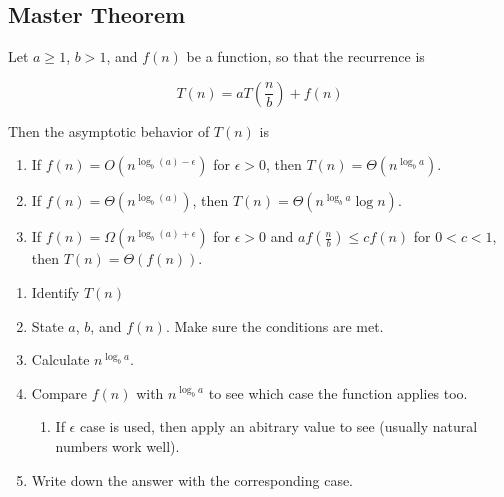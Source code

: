 \documentclass{article}
\begin{document}
\subsection{Master Theorem}
\begin{theorem}
    Let \( a \geq 1 \), \( b > 1 \), and \( f(n) \) be a function, so that the recurrence is 

    \begin{equation}
        T(n) = aT\left(\frac{n}{b}\right) + f(n)
    \end{equation}

    Then the asymptotic behavior of \( T(n) \) is
    \begin{enumerate}
        \item If \( f(n) = O\left(n^{\log_b (a) - \epsilon}\right) \) for \( \epsilon > 0 \), then \( T(n) = \Theta\left(n^{\log_b a}\right) \).
        
        \item If \( f(n) = \Theta\left(n^{\log_b (a)}\right) \), then \( T(n) = \Theta\left(n^{\log_b a} \log n\right) \).
        
        \item If \( f(n) = \Omega\left(n^{\log_b (a) + \epsilon}\right) \) for \( \epsilon > 0 \) and \( af\left(\frac{n}{b}\right) \leq cf(n) \) for \( 0 < c < 1 \), then \( T(n) = \Theta(f(n)) \).
    \end{enumerate}
\end{theorem}

\begin{process}
    \begin{enumerate}
        \item Identify $T(n)$
        \item State $a$, $b$, and $f(n)$. Make sure the conditions are met.
        \item Calculate $n^{\log_b a}$. 
        \item Compare $f(n)$ with $n^{\log_b a}$ to see which case the function applies too.
        \begin{enumerate}
            \item If $\epsilon$ case is used, then apply an abitrary value to see (usually natural numbers work well).
        \end{enumerate}
        \item Write down the answer with the corresponding case.
    \end{enumerate}
\end{process}
\end{document}
